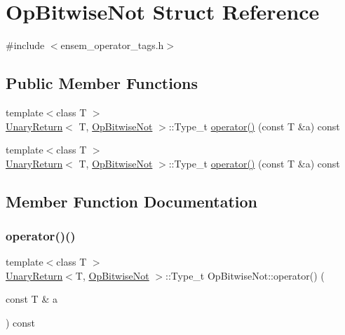 \hypertarget{structOpBitwiseNot}{}\section{Op\+Bitwise\+Not Struct Reference}
\label{structOpBitwiseNot}


{\ttfamily \#include $<$ensem\+\_\+operator\+\_\+tags.\+h$>$}

\subsection*{Public Member Functions}
\begin{DoxyCompactItemize}
\item 
{\footnotesize template$<$class T $>$ }\\\mbox{\hyperlink{structUnaryReturn}{Unary\+Return}}$<$ T, \mbox{\hyperlink{structOpBitwiseNot}{Op\+Bitwise\+Not}} $>$\+::Type\+\_\+t \mbox{\hyperlink{structOpBitwiseNot_a32565bc96d1f735f04d98179d595ae07}{operator()}} (const T \&a) const
\item 
{\footnotesize template$<$class T $>$ }\\\mbox{\hyperlink{structUnaryReturn}{Unary\+Return}}$<$ T, \mbox{\hyperlink{structOpBitwiseNot}{Op\+Bitwise\+Not}} $>$\+::Type\+\_\+t \mbox{\hyperlink{structOpBitwiseNot_a32565bc96d1f735f04d98179d595ae07}{operator()}} (const T \&a) const
\end{DoxyCompactItemize}


\subsection{Member Function Documentation}
\mbox{\label{structOpBitwiseNot_a32565bc96d1f735f04d98179d595ae07}} 
\subsubsection{\texorpdfstring{operator()()}{operator()()}\hspace{0.1cm}{\footnotesize\ttfamily [1/2]}}
{\footnotesize\ttfamily template$<$class T $>$ \\
\mbox{\hyperlink{structUnaryReturn}{Unary\+Return}}$<$T, \mbox{\hyperlink{structOpBitwiseNot}{Op\+Bitwise\+Not}} $>$\+::Type\+\_\+t Op\+Bitwise\+Not\+::operator() (\begin{DoxyParamCaption}\item[{const T \&}]{a }\end{DoxyParamCaption}) const\hspace{0.3cm}{\ttfamily [inline]}}

